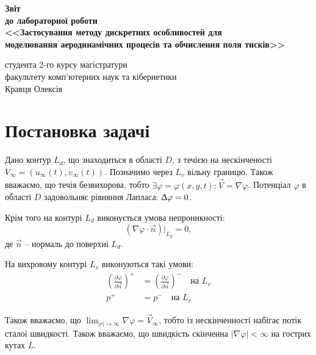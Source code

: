 \documentclass[a4paper,12pt]{article}
\begin{document}
	
	\begin{titlepage}
		\vspace*{6cm}
		\begin{center}
			
			\large
			\textbf{Звіт}\\
			\textbf{до лабораторної роботи}\\
			\textbf{<<Застосування
				методу дискретних особливостей для\\
				моделювання аеродинамічних процесів та обчислення поля тисків>>}
			
		\end{center}
		
		\vspace{8cm}
		\begin{flushright}
			студента 2-го курсу магістратури\\
			факультету комп'ютерних наук та кібернетики\\
			Кравця Олексія
		\end{flushright}
		
	\end{titlepage}
	
	\newpage
	
	\section{Постановка задачі}
	
	
	Дано контур $L_d$, що знаходиться в області $D$, з течією на нескінченості $V_{\infty} = (u_{\infty}(t), v_{\infty}(t))$. Позначимо через $L_v$ вільну границю. Також вважаємо, що течія безвихорова, тобто $\exists \varphi = \varphi(x,y,t) : \vec{V} = \nabla \varphi$. Потенціал $\varphi$ в області $D$ задовольняє рівняння Лапласа: $\Updelta \varphi =0$.
	
	Крім того на контурі $L_d$ виконується умова непроникності:
	\[
	\left( \nabla \varphi \cdot \vec{n} \right)|_{L_d} = 0,
	\]
	де $\vec{n}$ -- нормаль до поверхні $L_d$.
	
	На вихровому контурі $L_v$ виконуються такі умови:
	\begin{align}
	\left( \frac{\partial \varphi}{\partial \vec{n}} \right)^+ &= \left( \frac{\partial \varphi}{\partial \vec{n}} \right)^- \quad \text{на } L_v \nonumber \\
	p^+ &= p^- \quad \text{на } L_v \nonumber
	\end{align}
	
	Також вважаємо, що $\lim_{|r| \rightarrow \infty} \nabla \varphi = \vec{V}_{\infty}$, тобто із нескінченності набігає потік сталої швидкості. Також вважаємо, що швидкість скінченна $|\nabla \varphi| < \infty$ на гострих кутах $L$.
	
\end{document}
